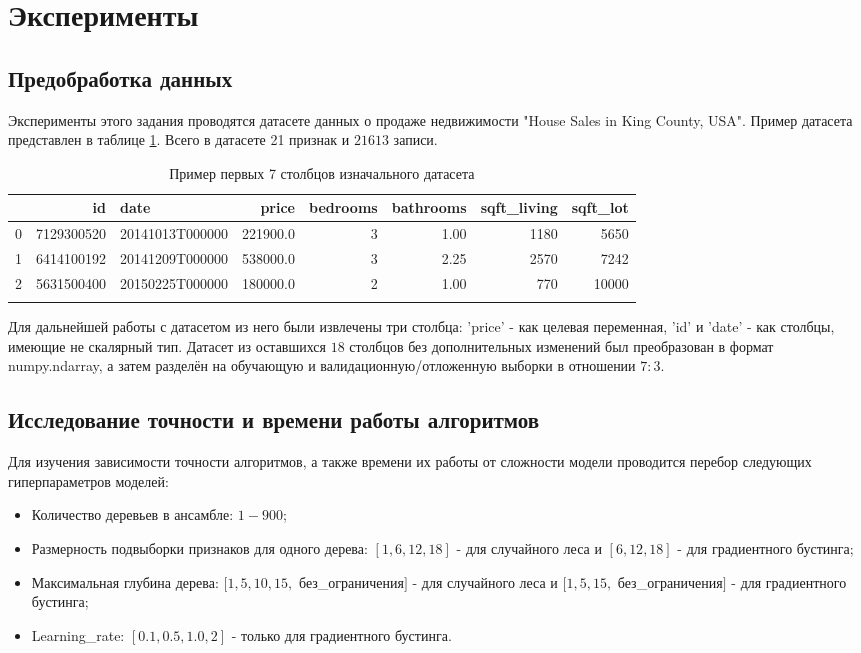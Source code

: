 \documentclass[12pt, a4paper]{article}
\begin{document}
\section{Эксперименты}
\subsection{Предобработка данных}

Эксперименты этого задания проводятся датасете данных о продаже недвижимости "House Sales in King County, USA". Пример датасета представлен в таблице \ref{Ex_1}. Всего в датасете 21 признак и  $21613$ записи.


\begin{table}[H]
\caption{Пример первых 7 столбцов изначального датасета}
\begin{center}
\begin{tabular}{lrlrrrrr}
\toprule
{} &          id &             date &     price &  bedrooms &  bathrooms &  sqft\_living &  sqft\_lot \\
\midrule
0 &  7129300520 &  20141013T000000 &  221900.0 &         3 &       1.00 &         1180 &      5650 \\
1 &  6414100192 &  20141209T000000 &  538000.0 &         3 &       2.25 &         2570 &      7242 \\
2 &  5631500400 &  20150225T000000 &  180000.0 &         2 &       1.00 &          770 &     10000 \\
\bottomrule
\label{Ex_1}
\end{tabular}
\end{center}
\end{table}


Для дальнейшей работы с датасетом из него были извлечены три столбца: 'price'  - как целевая переменная, 'id' и 'date'  - как столбцы, имеющие не скалярный тип. Датасет из оставшихся $18$ столбцов без дополнительных изменений был преобразован в формат  numpy.ndarray, а затем разделён на обучающую и валидационную/отложенную выборки в отношении $7:3$.

\subsection{Исследование точности и времени работы алгоритмов}

Для изучения зависимости точности алгоритмов, а также времени их работы от сложности модели проводится перебор следующих гиперпараметров моделей:
\begin{itemize}
\item Количество деревьев в ансамбле: $1 - 900$;
\item Размерность подвыборки признаков для одного дерева: $[1, 6, 12, 18]$ - для случайного леса и $[6, 12, 18]$ - для градиентного бустинга;
\item Максимальная глубина дерева: $[1, 5, 10, 15,$ без\_ограничения$]$ - для случайного леса и $[1, 5, 15,$ без\_ограничения$]$ - для градиентного бустинга;
\item Learning\_rate: $[0.1, 0.5, 1.0, 2]$ - только для градиентного бустинга.
\end{itemize}
\end{document}
